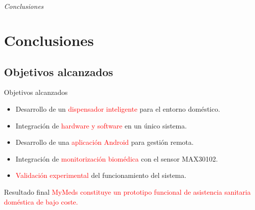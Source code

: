 \documentclass{beamer}
\begin{document}
\section*{}
\begin{frame}{}
  \centering \Huge
  \emph{Conclusiones}
\end{frame}

\section{Conclusiones}
\subsection{Objetivos alcanzados}

\begin{frame}
\begin{block}{Objetivos alcanzados}
\begin{itemize}
\item Desarrollo de un \textcolor{red}{dispensador inteligente} para el entorno doméstico.
\item Integración de \textcolor{red}{hardware y software} en un único sistema.
\item Desarrollo de una \textcolor{red}{aplicación Android} para gestión remota.
\item Integración de \textcolor{red}{monitorización biomédica} con el sensor MAX30102.
\item \textcolor{red}{Validación experimental} del funcionamiento del sistema.
\end{itemize}
\end{block}

\vspace{0.3cm}

\begin{block}{Resultado final}
\centering
\textcolor{red}{MyMeds constituye un prototipo funcional de asistencia sanitaria doméstica de bajo coste.}
\end{block}


\end{frame}
\end{document}
